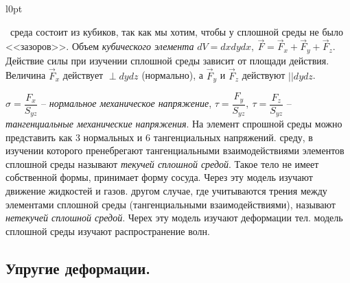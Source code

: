 \documentclass[9pt]{article}
\begin{document}
\begin{wrapfigure}[10]{l}{0pt}
{
}
\end{wrapfigure}

\ 
 среда состоит из кубиков, так как мы хотим, чтобы у сплошной среды не было <<зазоров>>. Объем \textit{кубического элемента} \(dV = dxdydx,\ \vec F = \vec F_x + \vec F_y + \vec F_z\). Действие силы при изучении сплошной среды зависит от площади действия. Величина \(\vec F_x\) действует \(\perp dydz\) (нормально), а \(\vec F_y\) и \(\vec F_z\) действуют \(||dydz\).
\par\(\sigma=\dfrac{F_x}{S_{yz}}\) -- \textit{нормальное механическое напряжение}, \(\tau=\dfrac{F_y}{S_{yz}},\ \tau=\dfrac{F_z}{S_{yz}}\) -- \textit{тангенциальные механические напряжения}. На элемент спрошной среды можно представить как 3 нормальных и 6 тангенциальных напряжений.
\parСплошную среду, в изучении которого пренебрегают тангенциальными взаимодействиями элементов сплошной среды называют \textit{текучей сплошной средой}. Такое тело не имеет собственной формы, принимает форму сосуда. Через эту модель изучают движение жидкостей и газов.
\parВ другом случае, где учитываются трения между элементами сплошной среды (тангенциальными взаимодействиями), называют \textit{нетекучей сплошной средой}. Черех эту модель изучают деформации тел.
\parЧерез модель сплошной среды изучают распространение волн.

\subsection{Упругие деформации.}
\end{document}
